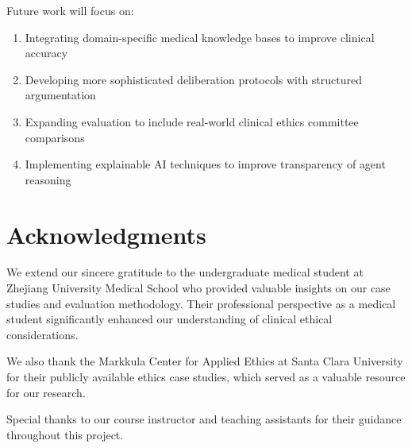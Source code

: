 \documentclass[11pt]{article}
\begin{document}
Future work will focus on:
\begin{enumerate}
    \item Integrating domain-specific medical knowledge bases to improve clinical accuracy
    \item Developing more sophisticated deliberation protocols with structured argumentation
    \item Expanding evaluation to include real-world clinical ethics committee comparisons
    \item Implementing explainable AI techniques to improve transparency of agent reasoning
\end{enumerate}

\section*{Acknowledgments}

We extend our sincere gratitude to the undergraduate medical student at Zhejiang University Medical School who provided valuable insights on our case studies and evaluation methodology. Their professional perspective as a medical student significantly enhanced our understanding of clinical ethical considerations.

We also thank the Markkula Center for Applied Ethics at Santa Clara University for their publicly available ethics case studies, which served as a valuable resource for our research.

Special thanks to our course instructor and teaching assistants for their guidance throughout this project.



\end{document}
